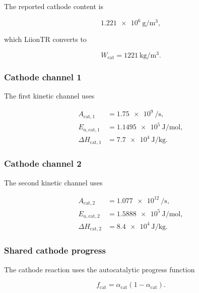 The reported cathode content is

\begin{equation}
    \num{1.221e6}
    \ \si{\gram\per\meter\cubed},
\end{equation}

which LiionTR converts to

\begin{equation}
    W_{\mathrm{cat}}
    =
    \SI{1221}{\kilogram\per\meter\cubed}.
\end{equation}


\subsubsection{Cathode channel 1}

The first kinetic channel uses

\begin{align}
    A_{\mathrm{cat},1}
    &=
    \num{1.75e9}
    \ \si{\per\second},
    \\
    E_{a,\mathrm{cat},1}
    &=
    \num{1.1495e5}
    \ \si{\joule\per\mole},
    \\
    \Delta H_{\mathrm{cat},1}
    &=
    \num{7.7e4}
    \ \si{\joule\per\kilogram}.
\end{align}


\subsubsection{Cathode channel 2}

The second kinetic channel uses

\begin{align}
    A_{\mathrm{cat},2}
    &=
    \num{1.077e12}
    \ \si{\per\second},
    \\
    E_{a,\mathrm{cat},2}
    &=
    \num{1.5888e5}
    \ \si{\joule\per\mole},
    \\
    \Delta H_{\mathrm{cat},2}
    &=
    \num{8.4e4}
    \ \si{\joule\per\kilogram}.
\end{align}


\subsubsection{Shared cathode progress}

The cathode reaction uses the autocatalytic progress function

\begin{equation}
    f_{\mathrm{cat}}
    =
    \alpha_{\mathrm{cat}}
    \left(
        1-\alpha_{\mathrm{cat}}
    \right).
    \label{eq:hu_cathode_progress}
\end{equation}

